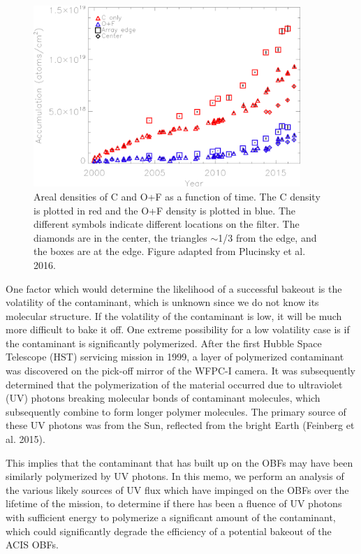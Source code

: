 \documentclass[11pt]{article}
\begin{document}
\begin{figure}
\begin{center}
\includegraphics[width=0.9\textwidth]{areal_density.eps}
\caption{Areal densities of C and O+F as a function of time. The C density is plotted
in red and the O+F density is plotted in blue. The different symbols indicate different
locations on the filter. The diamonds are in the center, the triangles $\sim$1/3 from
the edge, and the boxes are at the edge. Figure adapted from Plucinsky et al. 2016.\label{fig:areal_density}}
\end{center}
\end{figure}

One factor which would determine the likelihood of a successful bakeout is the volatility
of the contaminant, which is unknown since we do not know its molecular structure. If the
volatility of the contaminant is low, it will be much more difficult to bake it off. One
extreme possibility for a low volatility case is if the contaminant is significantly polymerized.
After the first Hubble Space Telescope (HST) servicing mission in 1999, a layer of polymerized
contaminant was discovered on the pick-off mirror of the WFPC-I camera. It was subsequently
determined that the polymerization of the material occurred due to ultraviolet (UV) photons
breaking molecular bonds of contaminant molecules, which subsequently combine to form longer
polymer molecules. The primary source of these UV photons was from the Sun, reflected from
the bright Earth (Feinberg et al. 2015).

This implies that the contaminant that has built up on the OBFs may have been similarly
polymerized by UV photons. In this memo, we perform an analysis of the various likely
sources of UV flux which have impinged on the OBFs over the lifetime of the mission,
to determine if there has been a fluence of UV photons with sufficient energy to polymerize
a significant amount of the contaminant, which could significantly degrade the efficiency
of a potential bakeout of the ACIS OBFs.
\end{document}
